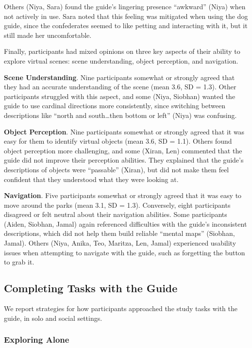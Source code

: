 Others (Niya, Sara) found the guide's lingering presence “awkward” (Niya) when not actively in use. Sara noted that this feeling was mitigated when using the dog guide, since the confederates seemed to like petting and interacting with it, but it still made her uncomfortable.

Finally, participants had mixed opinions on three key aspects of their ability to explore virtual scenes: scene understanding, object perception, and navigation.

\textbf{Scene Understanding}. Nine participants somewhat or strongly agreed that they had an accurate understanding of the scene (mean 3.6, SD = 1.3). Other participants struggled with this aspect, and some (Niya, Siobhan) wanted the guide to use cardinal directions more consistently, since switching between descriptions like “north and south…then bottom or left” (Niya) was confusing.

\textbf{Object Perception}. Nine participants somewhat or strongly agreed that it was easy for them to identify virtual objects (mean 3.6, SD = 1.1). Others found object perception more challenging, and some (Xiran, Len) commented that the guide did not improve their perception abilities. They explained that the guide’s descriptions of objects were “passable” (Xiran), but did not make them feel confident that they understood what they were looking at.

\textbf{Navigation}. Five participants somewhat or strongly agreed that it was easy to move around the parks (mean 3.1, SD = 1.3). Conversely, eight participants disagreed or felt neutral about their navigation abilities. Some participants (Aiden, Siobhan, Jamal) again referenced difficulties with the guide’s inconsistent descriptions, which did not help them build reliable “mental maps” (Siobhan, Jamal). Others (Niya, Anika, Teo, Maritza, Len, Jamal) experienced usability issues when attempting to navigate with the guide, such as forgetting the button to grab it.

\subsection{Completing Tasks with the Guide}
\label{Participant Strategies for Completing Tasks}

We report strategies for how participants approached the study tasks with the guide, in solo and social settings.

\subsubsection{Exploring Alone} \label{sec: Exploring Alone}

